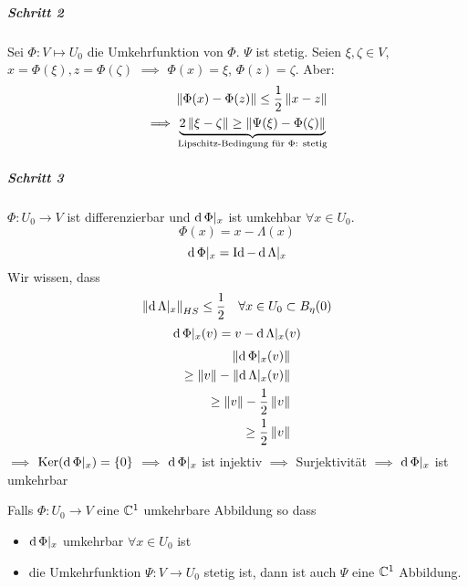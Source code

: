 \subparagraph{Schritt 2}
Sei $\Phi:V\mapsto U_0$ die Umkehrfunktion von $\Phi$. $\Psi$ ist stetig. Seien $\xi, \zeta\in V$, $x=\Phi(\xi), z=\Phi(\zeta)$ $\implies$ $\Phi(x)=\xi$, $\Phi(z)=\zeta$. Aber:
\begin{eqnarray*}
  \left\| \Phi(x)-\Phi(z) \right\|\leq\frac{1}{2}\left\| x-z \right\|\\
  \implies \underbrace{2\left\| \xi-\zeta \right\|\geq \left\| \Psi(\xi)-\Phi(\zeta) \right\|}_\text{Lipschitz-Bedingung für $\Phi$: stetig}
\end{eqnarray*}
\subparagraph{Schritt 3}
\begin{Bem}
  $\Phi:U_0\to V$ ist differenzierbar und $\operatorname{d}\Phi|_x$ ist umkehbar $\forall x\in U_0$.
  \[\Phi(x)=x-\Lambda(x)\]
  \[\operatorname{d}\Phi|_x=\operatorname{Id}-\operatorname{d}\Lambda|_x\]
  Wir wissen, dass
  \begin{align*}
    \left\| \operatorname{d}\Lambda|_x \right\|_{HS}\leq\frac{1}{2}& &\forall x\in U_0\subset B_\eta(0)
  \end{align*}
  \[\operatorname{d}\Phi|_x(v)=v-\operatorname{d}\Lambda|_x(v)\]
  \begin{eqnarray*}
    \left\| \operatorname{d}\Phi|_x(v) \right\|\\
    \geq \left\| v \right\|-\left\| \operatorname{d}\Lambda|_x(v) \right\|\\\
    \geq\left\| v \right\|-\frac{1}{2}\left\| v \right\|\\
    \geq\frac{1}{2}\left\| v \right\|
  \end{eqnarray*}
  $\implies$ $\operatorname{Ker}(\operatorname{d}\Phi|_x)=\left\{ 0 \right\}$ $\implies$ $\operatorname{d}\Phi|_x$ ist injektiv $\implies$ Surjektivität $\implies$ $\operatorname{d}\Phi|_x$ ist umkehrbar
\end{Bem}
\begin{Lem}
  Falls $\Phi:U_0\to V$ eine $\mathbb{C}^1$ umkehrbare Abbildung so dass
  \begin{itemize}
    \item $\operatorname{d}\Phi|_x$ umkehrbar $\forall x\in U_0$ ist
    \item die Umkehrfunktion $\Psi:V\to U_0$ stetig ist, dann ist auch $\Psi$ eine $\mathbb{C}^1$ Abbildung.
  \end{itemize}
\end{Lem}
